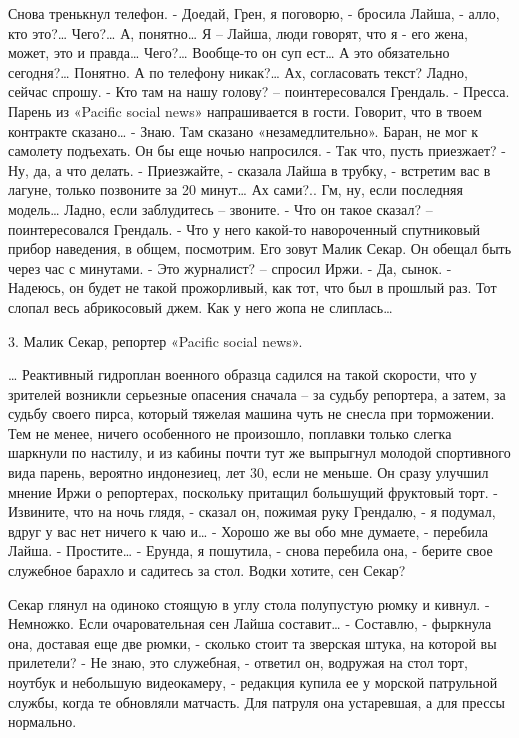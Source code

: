 \documentclass{book}
\begin{document}
Снова тренькнул телефон.
- Доедай, Грен, я поговорю, - бросила Лайша, - алло, кто это?\ldots{} Чего?\ldots{} А, понятно\ldots{} Я – Лайша, люди говорят, что я - его жена, может, это и правда\ldots{} Чего?\ldots{} Вообще-то он суп ест\ldots{} А это обязательно сегодня?\ldots{} Понятно. А по телефону никак?\ldots{} Ах, согласовать текст? Ладно, сейчас спрошу.
- Кто там на нашу голову? – поинтересовался Грендаль.
- Пресса. Парень из «Pacific social news» напрашивается в гости. Говорит, что в твоем контракте сказано\ldots{}
- Знаю. Там сказано «незамедлительно». Баран, не мог к самолету подъехать. Он бы еще ночью напросился.
- Так что, пусть приезжает?
- Ну, да, а что делать.
- Приезжайте, - сказала Лайша в трубку, - встретим вас в лагуне, только позвоните за 20 минут\ldots{} Ах сами?.. Гм, ну, если последняя модель\ldots{} Ладно, если заблудитесь – звоните.
- Что он такое сказал? – поинтересовался Грендаль.
- Что у него какой-то навороченный спутниковый прибор наведения, в общем, посмотрим. Его зовут Малик Секар. Он обещал быть через час с минутами.
- Это журналист? – спросил Иржи.
- Да, сынок.
- Надеюсь, он будет не такой прожорливый, как тот, что был в прошлый раз. Тот слопал весь абрикосовый джем. Как у него жопа не слиплась\ldots{}



3. Малик Секар, репортер «Pacific social news».


\ldots{} Реактивный гидроплан военного образца садился на такой скорости, что у зрителей возникли серьезные опасения сначала – за судьбу репортера, а затем, за судьбу своего пирса, который тяжелая машина чуть не снесла при торможении. Тем не менее, ничего особенного не произошло, поплавки только слегка шаркнули по настилу, и из кабины почти тут же выпрыгнул молодой спортивного вида парень, вероятно индонезиец, лет 30, если не меньше. Он сразу улучшил мнение Иржи о репортерах, поскольку притащил большущий фруктовый торт.
- Извините, что на ночь глядя, - сказал он, пожимая руку Грендалю, - я подумал, вдруг у вас нет ничего к чаю и\ldots{}
- Хорошо же вы обо мне думаете, - перебила Лайша.
- Простите\ldots{}
- Ерунда, я пошутила, - снова перебила она, - берите свое служебное барахло и садитесь за стол. Водки хотите, сен Секар?

Секар глянул на одиноко стоящую в углу стола полупустую рюмку и кивнул.
- Немножко. Если очаровательная сен Лайша составит\ldots{}
- Составлю, - фыркнула она, доставая еще две рюмки, - сколько стоит та зверская штука, на которой вы прилетели?
- Не знаю, это служебная, - ответил он, водружая на стол торт, ноутбук и небольшую видеокамеру, - редакция купила ее у морской патрульной службы, когда те обновляли матчасть. Для патруля она устаревшая, а для прессы нормально.
\end{document}
